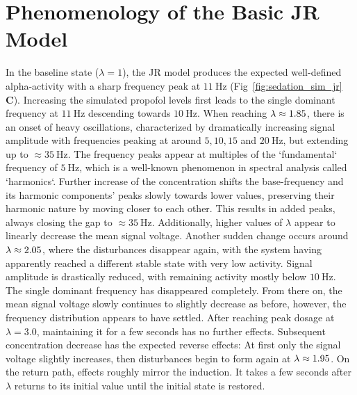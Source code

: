 \section{Phenomenology of the Basic JR Model}
    In the baseline state ($\lambda = 1$), the JR model produces the expected well-defined alpha-activity
    with a sharp frequency peak at $\SI{11}{\hertz}$ (Fig~\ref{fig:sedation_sim_jr} \textbf{C}).
    Increasing the simulated propofol levels first leads to the single dominant frequency at $\SI{11}{\hertz} $
    descending towards $\SI{10}{\hertz} $.
    When reaching $\lambda \approx 1.85 $,
    there is an onset of heavy oscillations, characterized by dramatically increasing signal amplitude
    with frequencies peaking at around $5, 10, 15$ and $ \SI{20}{\hertz} $,
    but extending up to $\approx \SI{35}{\hertz} $.
    The frequency peaks appear at multiples of the `fundamental` frequency of $\SI{5}{\hertz}$,
    which is a well-known phenomenon in spectral analysis called `harmonics`.
    Further increase of the concentration shifts the base-frequency and its harmonic components' peaks
    slowly towards lower values, preserving their harmonic nature by moving closer to each other.
    This results in added peaks, always closing the gap to $\approx \SI{35}{\hertz} $.
    Additionally, higher values of $\lambda$ appear to linearly decrease the mean signal voltage.
    Another sudden change occurs around $\lambda \approx 2.05 $,
    where the disturbances disappear again,
    with the system having apparently reached a different stable state with very low activity.
    Signal amplitude is drastically reduced, with remaining activity mostly below $\SI{10}{\hertz}$.
    The single dominant frequency has disappeared completely.
    From there on, the mean signal voltage slowly continues to slightly decrease as before,
    however, the frequency distribution appears to have settled.
    After reaching peak dosage at $\lambda = 3.0$, maintaining it for a few seconds has no further effects.
    Subsequent concentration decrease has the expected reverse effects:
    At first only the signal voltage slightly increases,
    then disturbances begin to form again at $\lambda \approx 1.95$.
    On the return path, effects roughly mirror the induction.
    It takes a few seconds after $\lambda$ returns to its initial value until the initial state is restored.

